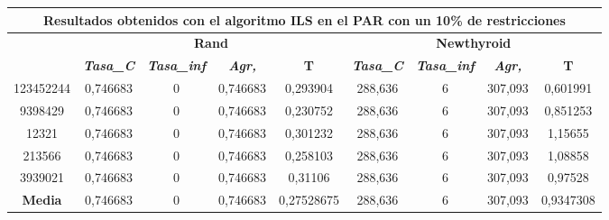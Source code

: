 \documentclass[12pt, spanish]{article}
\begin{document}
\begin{table}[H]
\begin{tabular}{|c|c|c|c|c|c|c|c|c|}
\hline
\multicolumn{9}{|c|}{\textbf{Resultados obtenidos con el algoritmo ILS en el PAR con un 10\% de restricciones}}                                                                                                   \\ \hline
\multirow{2}{*}{} & \multicolumn{4}{c|}{\textbf{Rand}}                                                            & \multicolumn{4}{c|}{\textbf{Newthyroid}}                                                      \\ \cline{2-9} 
                  & \textit{\textbf{Tasa\_C}} & \textit{\textbf{Tasa\_inf}} & \textit{\textbf{Agr,}} & \textbf{T} & \textit{\textbf{Tasa\_C}} & \textit{\textbf{Tasa\_inf}} & \textit{\textbf{Agr,}} & \textbf{T} \\ \hline
123452244         & 0,746683                  & 0                           & 0,746683               & 0,293904   & 288,636                   & 6                           & 307,093                & 0,601991   \\ \hline
9398429           & 0,746683                  & 0                           & 0,746683               & 0,230752   & 288,636                   & 6                           & 307,093                & 0,851253   \\ \hline
12321             & 0,746683                  & 0                           & 0,746683               & 0,301232   & 288,636                   & 6                           & 307,093                & 1,15655    \\ \hline
213566            & 0,746683                  & 0                           & 0,746683               & 0,258103   & 288,636                   & 6                           & 307,093                & 1,08858    \\ \hline
3939021           & 0,746683                  & 0                           & 0,746683               & 0,31106    & 288,636                   & 6                           & 307,093                & 0,97528    \\ \hline
\textbf{Media}    & 0,746683                  & 0                           & 0,746683               & 0,27528675 & 288,636                   & 6                           & 307,093                & 0,9347308  \\ \hline
\end{tabular}
\end{table}
\end{document}
